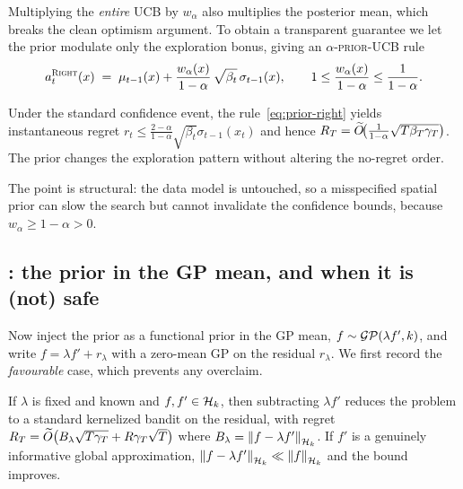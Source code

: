 Multiplying the \emph{entire} UCB by $w_\alpha$ also multiplies the posterior
mean, which breaks the clean optimism argument. To obtain a transparent
guarantee we let the prior modulate only the exploration bonus, giving an
$\alpha$-\textsc{prior}-UCB rule
\begin{equation}
  a_t^{\textsc{Right}}(x) \;=\; \mu_{t-1}(x)+\frac{w_\alpha(x)}{1-\alpha}\,
                       \sqrt{\beta_t}\,\sigma_{t-1}(x),
  \qquad 1\le\frac{w_\alpha(x)}{1-\alpha}\le\frac{1}{1-\alpha}.
  \label{eq:prior-right}
\end{equation}

\begin{proposition}
\label{prop:prior-safe}
Under the standard confidence event, the rule~\eqref{eq:prior-right} yields
instantaneous regret $r_t\le\frac{2-\alpha}{1-\alpha}\sqrt{\beta_t}\sigma_{t-1}(x_t)$
and hence $R_T=\widetilde O\!\bigl(\tfrac{1}{1-\alpha}\sqrt{T\beta_T\gamma_T}\bigr)$.
The prior changes the exploration pattern without altering the no-regret order.
\end{proposition}

The point is structural: the data model is untouched, so a misspecified spatial
prior can slow the search but cannot invalidate the confidence bounds, because
$w_\alpha\ge1-\alpha>0$.

\subsection{\WRONG: the prior in the GP mean, and when it is (not) safe}
\label{sec:contrib-prior-wrong}

Now inject the prior as a functional prior in the GP mean,
$f\sim\mathcal{GP}(\lambda f',k)$, and write $f=\lambda f'+r_\lambda$ with a zero-mean GP
on the residual $r_\lambda$. We first record the \emph{favourable} case, which
prevents any overclaim.

\begin{theorem}
\label{thm:prior-fixed}
If $\lambda$ is fixed and known and $f,f'\in\mathcal{H}_k$, then subtracting $\lambda f'$
reduces the problem to a standard kernelized bandit on the residual, with regret
$R_T=\widetilde O\bigl(B_\lambda\sqrt{T\gamma_T}+R\gamma_T\sqrt{T}\bigr)$ where
$B_\lambda=\left\lVert f-\lambda f'\right\rVert_{\mathcal{H}_k}$. If $f'$ is a genuinely informative global
approximation, $\left\lVert f-\lambda f'\right\rVert_{\mathcal{H}_k}\ll\left\lVert f\right\rVert_{\mathcal{H}_k}$ and the bound improves.
\end{theorem}

